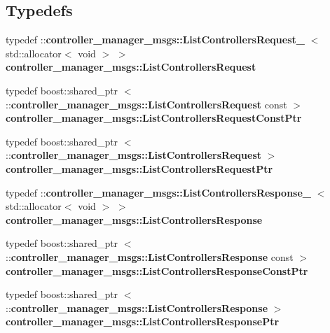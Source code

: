 \subsection*{\-Typedefs}
\begin{DoxyCompactItemize}
\item 
typedef \*
\-::{\bf controller\-\_\-manager\-\_\-msgs\-::\-List\-Controllers\-Request\-\_\-}\*
$<$ std\-::allocator$<$ void $>$ $>$ {\bf controller\-\_\-manager\-\_\-msgs\-::\-List\-Controllers\-Request}
\item 
typedef boost\-::shared\-\_\-ptr\*
$<$ \-::{\bf controller\-\_\-manager\-\_\-msgs\-::\-List\-Controllers\-Request} \*
const  $>$ {\bf controller\-\_\-manager\-\_\-msgs\-::\-List\-Controllers\-Request\-Const\-Ptr}
\item 
typedef boost\-::shared\-\_\-ptr\*
$<$ \-::{\bf controller\-\_\-manager\-\_\-msgs\-::\-List\-Controllers\-Request} $>$ {\bf controller\-\_\-manager\-\_\-msgs\-::\-List\-Controllers\-Request\-Ptr}
\item 
typedef \*
\-::{\bf controller\-\_\-manager\-\_\-msgs\-::\-List\-Controllers\-Response\-\_\-}\*
$<$ std\-::allocator$<$ void $>$ $>$ {\bf controller\-\_\-manager\-\_\-msgs\-::\-List\-Controllers\-Response}
\item 
typedef boost\-::shared\-\_\-ptr\*
$<$ \-::{\bf controller\-\_\-manager\-\_\-msgs\-::\-List\-Controllers\-Response} \*
const  $>$ {\bf controller\-\_\-manager\-\_\-msgs\-::\-List\-Controllers\-Response\-Const\-Ptr}
\item 
typedef boost\-::shared\-\_\-ptr\*
$<$ \-::{\bf controller\-\_\-manager\-\_\-msgs\-::\-List\-Controllers\-Response} $>$ {\bf controller\-\_\-manager\-\_\-msgs\-::\-List\-Controllers\-Response\-Ptr}
\end{DoxyCompactItemize}

